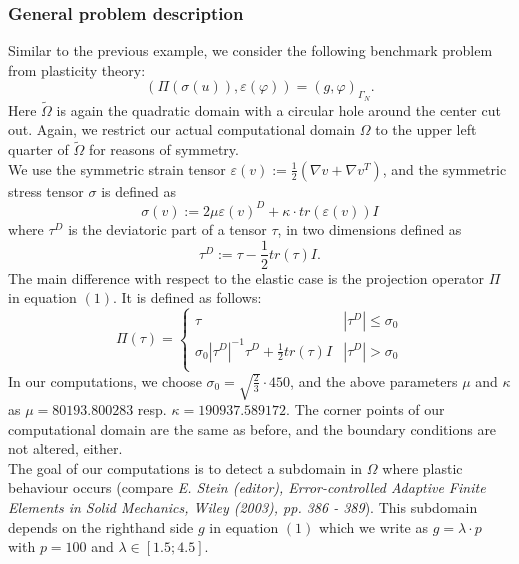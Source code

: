 \subsubsection{General problem description}

Similar to the previous example, we consider the following benchmark problem from plasticity theory:
\begin{equation}
   (\Pi(\sigma(u)),\varepsilon(\varphi)) = (g,\varphi)_{\Gamma_N}.
\end{equation}
Here $\tilde{\Omega}$ is again the quadratic domain with a circular hole around the center cut out. Again, we restrict our actual computational domain $\Omega$ to the upper left quarter of $\tilde{\Omega}$ for reasons of symmetry.\\
We use the symmetric strain tensor $\varepsilon(v) := \frac{1}{2}(\nabla v + \nabla v^T)$, and the symmetric stress tensor $\sigma$ is defined as
\begin{equation*}
   \sigma(v) := 2\mu \varepsilon(v)^D + \kappa \cdot tr (\varepsilon(v)) I
\end{equation*}
where $\tau^D$ is the deviatoric part of a tensor $\tau$, in two dimensions defined as
\begin{equation*}
   \tau^D := \tau - \frac{1}{2} tr(\tau) I.
\end{equation*}
The main difference with respect to the elastic case is the projection operator $\Pi$ in equation $(1)$. It is defined as follows:
\begin{equation*}
\Pi(\tau) = \left\{
            \begin{array}{lr}
            \tau & |\tau^D| \leq \sigma_0\\
            \sigma_0 |\tau^D|^{-1} \tau^D + \frac{1}{2} tr(\tau) I & |\tau^D| > \sigma_0\\ 
            \end{array}
            \right. 
\end{equation*}
In our computations, we choose $\sigma_0 = \sqrt{\frac{2}{3}}\cdot 450$, and the above parameters $\mu$ and $\kappa$ as $\mu = 80193.800283$ resp. $\kappa = 190937.589172$. The corner points of our computational domain are the same as before, and the boundary conditions are not altered, either.\\
The goal of our computations is to detect a subdomain in $\Omega$ where plastic behaviour occurs (compare \textit{E. Stein (editor), Error-controlled Adaptive Finite Elements in Solid Mechanics, Wiley (2003), pp. 386 - 389}). This subdomain depends on the righthand side $g$ in equation $(1)$ which we write as $g = \lambda \cdot p$ with $p = 100$ and $\lambda \in [1.5;4.5]$.\\

